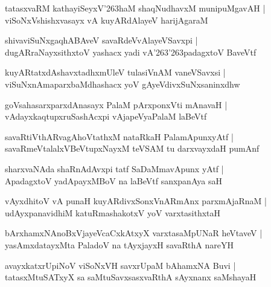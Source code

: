 \documentclass[twoside,12pt,openright]{book}
\def\S{\char'263}
\newcounter{shloka}[chapter]
\begin{document}
\begin{shloka}%
tatasxvaRM kathayiSeyxV\S haM shaqNudhavxM munipuMgavAH |\\
viSoNxVshishxvasayx vA kuyARdAlayeV harijAgaraM 
\end{shloka}

\begin{shloka}%
shivaviSuNxgaqhABAveV savaRdeVvAlayeVSavxpi |\\
dugARraNayxsithxtoV yashacx yadi vA\S \S padagxtoV BaveVtf 
\end{shloka}

\begin{shloka}%
kuyARtatxdAshavxtadhxmUleV tulasiVnAM vaneVSavxsi |\\
viSuNxnAmaparxbaMdhashacx yoV gAyeVdivxSuNxsaninxdhw 
\end{shloka}

\begin{shloka}%
goVsahasarxparxdAnasayx PalaM pArxponxVti mAnavaH |\\
vAdayxkaqtupxruSashAcxpi vAjapeVyaPalaM laBeVtf
\end{shloka}

\begin{shloka}%
savaRtiVthARvagAhoVtathxM nataRkaH PalamApunxyAtf |\\
savaRmeVtalalxVBeVtupxNayxM teVSAM tu darxvayxdaH pumAnf 
\end{shloka}

\begin{shloka}%
sharxvaNAda shaRnAdAvxpi tatf SaDaMmavApunx yAtf |\\
ApadagxtoV yadApayxMBoV na laBeVtf sanxpanAya saH 
\end{shloka}

\begin{shloka}%
vAyxdhitoV vA punaH kuyARdivxSonxVnARmAnx parxmAjaRnaM |\\
udAyxpanavidhiM katuRmashakotxV yoV varxtasithxtaH
\end{shloka}

\begin{shloka}%
bArxhamxNAnoBxVjayeVcaCxkAtxyX varxtasaMpUNaR heVtaveV |\\
yasAmxdatayxMta PaladoV na tAyxjayxH savaRthA nareYH 
\end{shloka}

\begin{shloka}%
avayxkatxrUpiNoV viSoNxVH savxrUpaM bAhamxNA Buvi |\\
tatasxMtuSATxyX sa saMtuSavxsasxvaRthA sAyxnanx saMshayaH 
\end{shloka}
\end{document}
